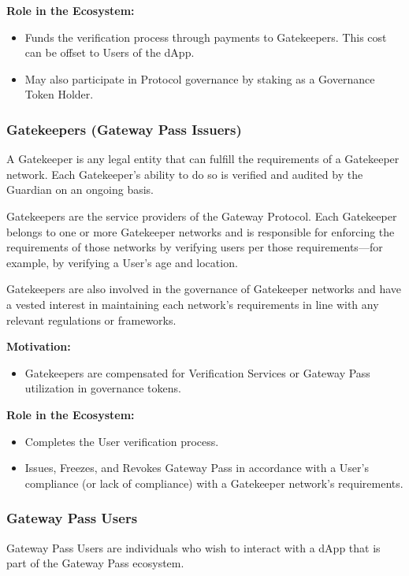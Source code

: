 \textbf{Role in the Ecosystem:}
\begin{itemize}
\item Funds the verification process through payments to Gatekeepers. This cost can be offset to Users of the dApp.
\item May also participate in Protocol governance by staking as a Governance Token Holder.
\end{itemize}

\subsubsection{Gatekeepers (Gateway Pass Issuers)}
A Gatekeeper is any legal entity that can fulfill the requirements of a Gatekeeper network. Each Gatekeeper's ability to do so is verified and audited by the Guardian on an ongoing basis.

Gatekeepers are the service providers of the Gateway Protocol. Each Gatekeeper belongs to one or more Gatekeeper networks and is responsible for enforcing the requirements of those networks by verifying users per those requirements—for example, by verifying a User’s age and location.

Gatekeepers are also involved in the governance of Gatekeeper networks and have a vested interest in maintaining each network’s requirements in line with any relevant regulations or frameworks.

\vspace{1em}

\textbf{Motivation:}
\begin{itemize}
\item Gatekeepers are compensated for Verification Services or Gateway Pass utilization in governance tokens.
\end{itemize}

\textbf{Role in the Ecosystem:}
\begin{itemize}
\item Completes the User verification process.
\item Issues, Freezes, and Revokes Gateway Pass in accordance with a User’s compliance (or lack of compliance) with a Gatekeeper network’s requirements.
\end{itemize}

\subsubsection{Gateway Pass Users}
Gateway Pass Users are individuals who wish to interact with a dApp that is part of the Gateway Pass ecosystem.

